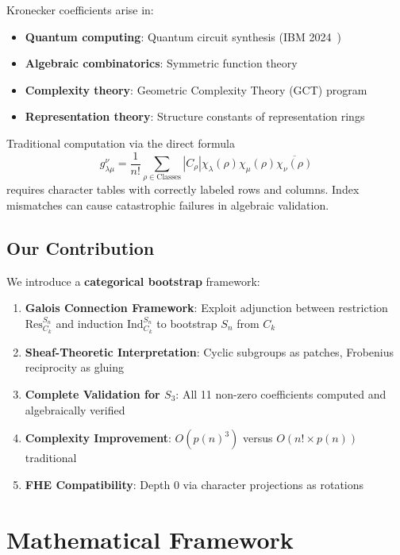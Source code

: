 \documentclass[11pt]{article}
\theoremstyle{definition}
\theoremstyle{remark}
\begin{document}
Kronecker coefficients arise in:
\begin{itemize}
\item \textbf{Quantum computing}: Quantum circuit synthesis (IBM 2024~\cite{ibm2024})
\item \textbf{Algebraic combinatorics}: Symmetric function theory
\item \textbf{Complexity theory}: Geometric Complexity Theory (GCT) program
\item \textbf{Representation theory}: Structure constants of representation rings
\end{itemize}

Traditional computation via the direct formula
\begin{equation}
g^\nu_{\lambda\mu} = \frac{1}{n!} \sum_{\rho \in \text{Classes}} |C_\rho| \chi_\lambda(\rho) \chi_\mu(\rho) \overline{\chi_\nu(\rho)}
\end{equation}
requires character tables with correctly labeled rows and columns. Index mismatches can cause catastrophic failures in algebraic validation.

\subsection{Our Contribution}

We introduce a \textbf{categorical bootstrap} framework:

\begin{enumerate}
\item \textbf{Galois Connection Framework}: Exploit adjunction between restriction $\text{Res}^{S_n}_{C_k}$ and induction $\text{Ind}_{C_k}^{S_n}$ to bootstrap $S_n$ from $C_k$
\item \textbf{Sheaf-Theoretic Interpretation}: Cyclic subgroups as patches, Frobenius reciprocity as gluing
\item \textbf{Complete Validation for $S_3$}: All 11 non-zero coefficients computed and algebraically verified
\item \textbf{Complexity Improvement}: $O(p(n)^3)$ versus $O(n! \times p(n))$ traditional
\item \textbf{FHE Compatibility}: Depth 0 via character projections as rotations
\end{enumerate}

\section{Mathematical Framework}
\end{document}
